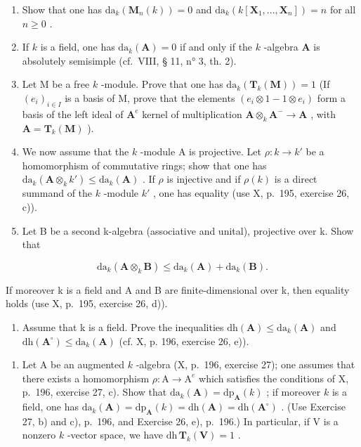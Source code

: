 \begin{enumerate}
\def\labelenumi{\alph{enumi})}
\item
  Show that one has \(\mathrm{da}_k(\mathbf{M}_n(k)) = 0\) and \(\mathrm{da}_k(k[\mathbf{X}_1, \ldots, \mathbf{X}_n]) = n\) for all \(n \geqslant 0\) .
\item
  If \(k\) is a field, one has \(\mathrm{da}_{k}(\mathbf{A}) = 0\) if and only if the \(k\) -algebra \(\mathbf{A}\) is absolutely semisimple (cf.~VIII, § 11, n° 3, th. 2).
\item
  Let M be a free \(k\) -module. Prove that one has \(\mathrm{da}_{k}(\mathbf{T}_{k}(\mathbf{M})) = 1\) (If \((e_{i})_{i \in I}\) is a basis of M, prove that the elements \((e_{i} \otimes 1 - 1 \otimes e_{i})\) form a basis of the left ideal of \(\mathbf{A}^{e}\) kernel of multiplication \(\mathbf{A} \otimes_{k} \mathbf{A}^{-} \to \mathbf{A}\) , with \(\mathbf{A} = \mathbf{T}_{k}(\mathbf{M})\) ).
\item
  We now assume that the \(k\) -module A is projective. Let \(\rho: k \to k'\) be a homomorphism of commutative rings; show that one has \(\mathrm{da}_k(\mathbf{A} \otimes_k k') \leqslant \mathrm{da}_k(\mathbf{A})\) . If \(\rho\) is injective and if \(\rho(k)\) is a direct summand of the \(k\) -module \(k'\) , one has equality (use X, p.~195, exercise 26, c)).
\item
  Let B be a second k-algebra (associative and unital), projective over k. Show that
\end{enumerate}

\[
\mathrm{da} _ {k} (\mathbf {A} \otimes_ {k} \mathbf {B}) \leqslant \mathrm{da} _ {k} (\mathbf {A}) + \mathrm{da} _ {k} (\mathbf {B}).
\]

If moreover k is a field and A and B are finite-dimensional over k, then equality holds (use X, p.~195, exercise 26, d)).

\begin{enumerate}
\def\labelenumi{\alph{enumi})}
\setcounter{enumi}{5}
\tightlist
\item
  Assume that k is a field. Prove the inequalities \(\mathrm{dh}(\mathbf{A}) \leqslant \mathrm{da}_{k}(\mathbf{A})\) and \(\mathrm{dh}(\mathbf{A}^{\circ}) \leqslant \mathrm{da}_{k}(\mathbf{A})\) (cf. X, p. 196, exercise 26, e)).
\end{enumerate}

\begin{enumerate}
\def\labelenumi{\arabic{enumi})}
\setcounter{enumi}{25}
\tightlist
\item
  Let A be an augmented \(k\) -algebra (X, p.~196, exercise 27); one assumes that there exists a homomorphism \(\rho: \mathrm{A} \to \mathrm{A}^e\) which satisfies the conditions of X, p.~196, exercise 27, c). Show that \(\mathrm{da}_k(\mathbf{A}) = \mathrm{dp}_\mathbf{A}(k)\) ; if moreover \(k\) is a field, one has \(\mathrm{da}_k(\mathbf{A}) = \mathrm{dp}_\mathbf{A}(k) = \mathrm{dh}(\mathbf{A}) = \mathrm{dh}(\mathbf{A}^\circ)\) . (Use Exercise 27, b) and c), p.~196, and Exercise 26, e), p.~196.) In particular, if V is a nonzero \(k\) -vector space, we have \(\mathrm{dh}\,\mathbf{T}_k(\mathbf{V}) = 1\) .
\end{enumerate}

